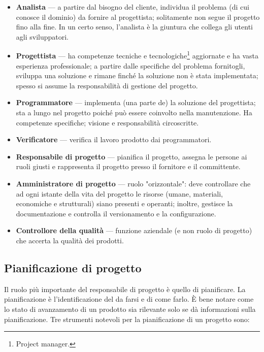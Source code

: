 \documentclass[a4paper]{article}
\begin{document}
	\begin{itemize}
		
			
	\item \textbf{Analista} --- a partire dal bisogno del cliente, individua il problema (di cui conosce il dominio) da fornire al progettista; solitamente non segue il progetto fino alla fine. In un certo senso, l'analista è la giuntura che collega gli utenti agli sviluppatori.
			
	\item \textbf{Progettista} --- ha competenze tecniche e tecnologiche\footnote{Project manager.} aggiornate e ha vasta esperienza professionale; a partire dalle specifiche del problema fornitogli, sviluppa una soluzione e rimane finché la soluzione non è stata implementata; spesso si assume la responsabilità di gestione del progetto.
			
	\item \textbf{Programmatore} --- implementa (una parte de) la soluzione del progettista; sta a lungo nel progetto poiché può essere coinvolto nella manutenzione. Ha competenze specifiche; visione e responsabilità circoscritte.
			
	\item \textbf{Verificatore} --- verifica il lavoro prodotto dai programmatori.
			
	\item \textbf{Responsabile di progetto} --- pianifica il progetto, assegna le persone ai ruoli giusti e rappresenta il progetto presso il fornitore e il committente.
			
	\item \textbf{Amministratore di progetto} --- ruolo "orizzontale": deve controllare che ad ogni istante della vita del progetto le risorse (umane, materiali, economiche e strutturali) siano presenti e operanti; inoltre, gestisce la documentazione e controlla il versionamento e la configurazione.
			
	\item \textbf{Controllore della qualità} --- funzione aziendale (e non ruolo di progetto) che accerta la qualità dei prodotti.
		
	\end{itemize}


		
	\subsection{Pianificazione di progetto}

		
Il ruolo più importante del responsabile di progetto è quello di pianificare. La pianificazione è l'identificazione del da farsi e di come farlo. È bene notare come lo stato di avanzamento di un prodotto sia rilevante solo se dà informazioni sulla pianificazione. Tre strumenti notevoli per la pianificazione di un progetto sono:
		
\end{document}
